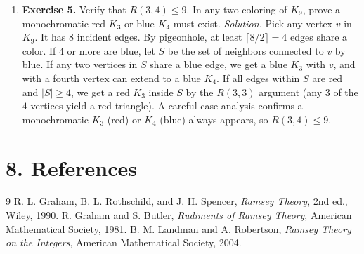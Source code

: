 \begin{enumerate}[leftmargin=*,itemsep=0.9em]
\item \textbf{Exercise 5.} Verify that $R(3,4)\leq 9$. In any two-coloring of $K_9$, prove a monochromatic red $K_3$ or blue $K_4$ must exist. \emph{Solution.} Pick any vertex $v$ in $K_9$. It has $8$ incident edges. By pigeonhole, at least $\lceil 8/2\rceil=4$ edges share a color. If $4$ or more are blue, let $S$ be the set of neighbors connected to $v$ by blue. If any two vertices in $S$ share a blue edge, we get a blue $K_3$ with $v$, and with a fourth vertex can extend to a blue $K_4$. If all edges within $S$ are red and $|S|\geq 4$, we get a red $K_3$ inside $S$ by the $R(3,3)$ argument (any $3$ of the $4$ vertices yield a red triangle). A careful case analysis confirms a monochromatic $K_3$ (red) or $K_4$ (blue) always appears, so $R(3,4)\leq 9$.

\end{enumerate}
\section*{8. References}
\begin{thebibliography}{9}
 R. L. Graham, B. L. Rothschild, and J. H. Spencer, \emph{Ramsey Theory}, 2nd ed., Wiley, 1990.
 R. Graham and S. Butler, \emph{Rudiments of Ramsey Theory}, American Mathematical Society, 1981.
 B. M. Landman and A. Robertson, \emph{Ramsey Theory on the Integers}, American Mathematical Society, 2004.
\end{thebibliography}
